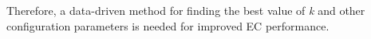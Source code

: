 Therefore, a data-driven  method for finding the best value of \textit{k} and other configuration parameters is needed for improved EC performance.



